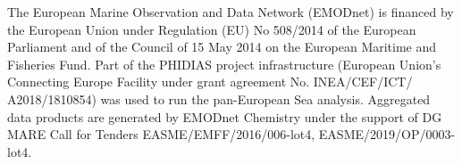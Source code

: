 \documentclass[essd, manuscript]{copernicus}
\begin{document}
\begin{acknowledgements}
The European Marine Observation and Data Network (EMODnet) is financed by the European Union under Regulation (EU) No 508/2014 of the European Parliament and of the Council of 15 May 2014 on the European Maritime and Fisheries Fund. Part of the PHIDIAS project infrastructure (European Union’s Connecting Europe Facility under grant agreement No. INEA/CEF/ICT/ A2018/1810854) was used to run the pan-European Sea analysis. Aggregated data products are generated by EMODnet Chemistry under the support of DG MARE Call for Tenders EASME/EMFF/2016/006-lot4, EASME/2019/OP/0003-lot4.
\end{acknowledgements}







\end{document}
